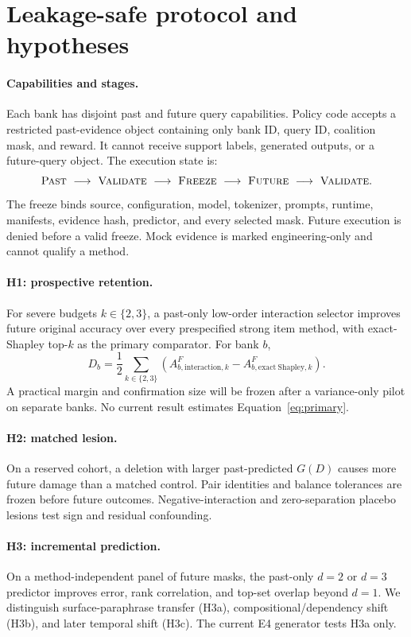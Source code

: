 \section{Leakage-safe protocol and hypotheses}
\label{sec:protocol}

\paragraph{Capabilities and stages.}
Each bank has disjoint past and future query capabilities. Policy code accepts a
restricted past-evidence object containing only bank ID, query ID, coalition mask,
and reward. It cannot receive support labels, generated outputs, or a future-query
object. The execution state is:
\[
\textsc{Past}\ \longrightarrow\ \textsc{Validate}\ \longrightarrow\
\textsc{Freeze}\ \longrightarrow\ \textsc{Future}\ \longrightarrow\
\textsc{Validate}.
\]
The freeze binds source, configuration, model, tokenizer, prompts, runtime,
manifests, evidence hash, predictor, and every selected mask. Future execution is
denied before a valid freeze. Mock evidence is marked engineering-only and cannot
qualify a method.

\paragraph{H1: prospective retention.}
For severe budgets \(k\in\{2,3\}\), a past-only low-order interaction selector
improves future original accuracy over every prespecified strong item method, with
exact-Shapley top-\(k\) as the primary comparator. For bank \(b\),
\begin{equation}
D_b=\frac12\sum_{k\in\{2,3\}}
\left(A^F_{b,\mathrm{interaction},k}
-A^F_{b,\mathrm{exact\ Shapley},k}\right).
\label{eq:primary}
\end{equation}
A practical margin and confirmation size will be frozen after a variance-only pilot
on separate banks. No current result estimates Equation~\ref{eq:primary}.

\paragraph{H2: matched lesion.}
On a reserved cohort, a deletion with larger past-predicted \(G(D)\) causes more
future damage than a matched control. Pair identities and balance tolerances are
frozen before future outcomes. Negative-interaction and zero-separation placebo
lesions test sign and residual confounding.

\paragraph{H3: incremental prediction.}
On a method-independent panel of future masks, the past-only \(d=2\) or \(d=3\)
predictor improves error, rank correlation, and top-set overlap beyond \(d=1\).
We distinguish surface-paraphrase transfer (H3a), compositional/dependency shift
(H3b), and later temporal shift (H3c). The current E4 generator tests H3a only.

